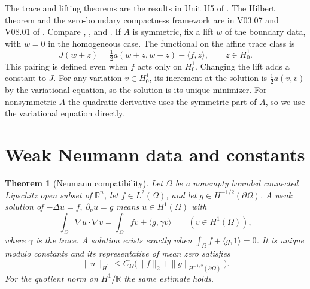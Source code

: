 \documentclass[11pt,oneside,openany]{book}
\theoremstyle{plain}
\newtheorem{theorem}{Theorem}[chapter]
\theoremstyle{definition}
\theoremstyle{remark}
\begin{document}
The trace and lifting theorems are the results in Unit U5 of
\cite{P102}. The Hilbert theorem and the zero-boundary compactness
framework are in V03.07 and V08.01 of \cite{P106}. Compare
\cite[Sections 6.2.1--6.2.2]{Evans},
\cite[Sections 9.2.2--9.2.4]{RR}, and \cite[Section 8.2]{GT}.
If \(A\) is symmetric, fix a lift \(w\) of the boundary data, with
\(w=0\) in the homogeneous case. The functional on the affine trace
class is
\[
 J(w+z)=\tfrac12a(w+z,w+z)-\langle f,z\rangle,
                  \qquad z\in H_0^1 .
\]
This pairing is defined even when \(f\) acts only on \(H_0^1\).
Changing the lift adds a constant to \(J\). For any variation
\(v\in H_0^1\), its increment at the solution is
\(\tfrac12a(v,v)\) by the variational equation, so the solution is
its unique minimizer. For nonsymmetric \(A\) the quadratic
derivative uses the symmetric part of \(A\), so we use the
variational equation directly.

\section{Weak Neumann data and constants}\label{pde:E02}

\begin{theorem}[Neumann compatibility]\label{pde:elliptic-neumann}
Let \(\Omega\) be a nonempty bounded connected Lipschitz open subset
of \(\mathbb R^n\), let \(f\in L^2(\Omega)\), and let
\(g\in H^{-1/2}(\partial\Omega)\). A weak solution of
\(-\Delta u=f,\ \partial_\nu u=g\) means \(u\in H^1(\Omega)\) with
\[
 \int_\Omega\nabla u\cdot\nabla v
  =\int_\Omega fv+\langle g,\gamma v\rangle
   \qquad(v\in H^1(\Omega)),
\]
where \(\gamma\) is the trace. A solution exists exactly when
\(\int_\Omega f+\langle g,1\rangle=0\).
It is unique modulo constants and its representative of mean zero
satisfies
\[
 \|u\|_{H^1}\leq C_\Omega
 \bigl(\|f\|_{2}+\|g\|_{H^{-1/2}(\partial\Omega)}\bigr).
\]
For the quotient norm on \(H^1/\mathbb R\) the same estimate holds.
\end{theorem}
\end{document}
